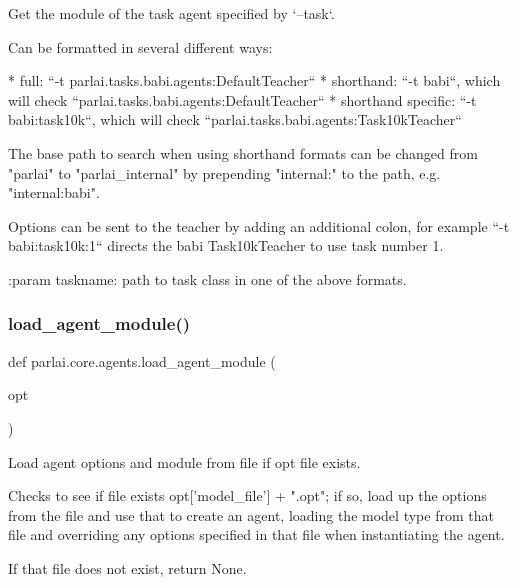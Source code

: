 \begin{DoxyVerb}Get the module of the task agent specified by `--task`.

Can be formatted in several different ways:

* full: ``-t parlai.tasks.babi.agents:DefaultTeacher``
* shorthand: ``-t babi``, which will check
    ``parlai.tasks.babi.agents:DefaultTeacher``
* shorthand specific: ``-t babi:task10k``, which will check
    ``parlai.tasks.babi.agents:Task10kTeacher``

The base path to search when using shorthand formats can be changed from
"parlai" to "parlai_internal" by prepending "internal:" to the path, e.g.
"internal:babi".

Options can be sent to the teacher by adding an additional colon,
for example ``-t babi:task10k:1`` directs the babi Task10kTeacher to use
task number 1.

:param taskname: path to task class in one of the above formats.
\end{DoxyVerb}
 \mbox{\label{namespaceparlai_1_1core_1_1agents_a213df46dd21144eb4c056bb58c294c5d}} 
\subsubsection{\texorpdfstring{load\+\_\+agent\+\_\+module()}{load\_agent\_module()}}
{\footnotesize\ttfamily def parlai.\+core.\+agents.\+load\+\_\+agent\+\_\+module (\begin{DoxyParamCaption}\item[{}]{opt }\end{DoxyParamCaption})}

\begin{DoxyVerb}Load agent options and module from file if opt file exists.

Checks to see if file exists opt['model_file'] + ".opt"; if so, load up the
options from the file and use that to create an agent, loading the model
type from that file and overriding any options specified in that file when
instantiating the agent.

If that file does not exist, return None.
\end{DoxyVerb}
 \mbox{\label{namespaceparlai_1_1core_1_1agents_a7a5f5076b35ce376d8b46bfb362bfc53}} 
